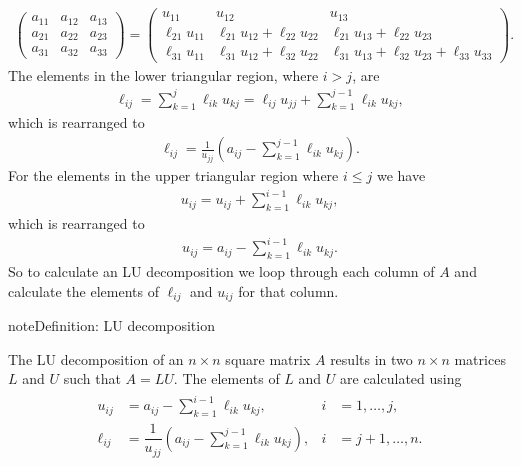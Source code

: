 \documentclass[letterpaper,10pt,english]{jupyterBook}
\begin{document}
\begin{align*}
    \begin{pmatrix}
        a_{11}  & a_{12}  & a_{13} \\
        a_{21}  & a_{22}  & a_{23} \\
        a_{31}  & a_{32}  & a_{33} 
    \end{pmatrix}=
    \begin{pmatrix}
        u_{11}  & u_{12}  & u_{13} \\
        \ell_{21} u_{11}  & \ell_{21} u_{12} + \ell_{22} u_{22}  & \ell_{21} u_{13} + \ell_{22} u_{23} \\
        \ell_{31} u_{11}  & \ell_{31} u_{12} + \ell_{32} u_{22}  & \ell_{31} u_{13} +\ell_{32} u_{23} +\ell_{33} u_{33} 
    \end{pmatrix}.
\end{align*}
\sphinxAtStartPar
The elements in the lower triangular region, where \(i>j\), are
\begin{align*}
    \ell_{ij} =\sum_{k=1}^j \ell_{ik} u_{kj} =\ell_{ij} u_{jj} +\sum_{k=1}^{j-1} \ell_{ik} u_{kj}, 
\end{align*}
\sphinxAtStartPar
which is rearranged to
\begin{align*}
    \ell_{ij} =\frac{1}{u_{jj} }\left(a_{ij} -\sum_{k=1}^{j-1} \ell_{ik} u_{kj} \right).
\end{align*}
\sphinxAtStartPar
For the elements in the upper triangular region where \(i\le j\) we have
\begin{align*}
    u_{ij} =u_{ij} +\sum_{k=1}^{i-1} \ell_{ik} u_{kj},
\end{align*}
\sphinxAtStartPar
which is rearranged to
\begin{align*}
    u_{ij} = a_{ij} -\sum_{k=1}^{i-1} \ell_{ik} u_{kj}.
\end{align*}
\sphinxAtStartPar
So to calculate an LU decomposition we loop through each column of \(A\) and calculate the elements of \(\ell_{ij}\) and \(u_{ij}\) for that column.

\begin{sphinxadmonition}{note}{Definition: LU decomposition}

\sphinxAtStartPar
The LU decomposition of an \(n \times n\) square matrix \(A\) results in two \(n \times n\) matrices \(L\) and \(U\) such that \(A = LU\). The elements of \(L\) and \(U\) are calculated using
\begin{equation}\label{equation:6_Direct_methods/6.1_LU_decomposition:lu-equation}
\begin{split}\begin{align}
u_{ij} &= a_{ij} - \sum_{k=1}^{i-1} \ell_{ik}u_{kj}, & i &= 1, \ldots, j, \\
\ell_{ij} &= \dfrac{1}{u_{jj}} \left(a_{ij} - \displaystyle \sum_{k=1}^{j-1} \ell_{ik}u_{kj}\right), & i &= j+1, \ldots, n.
\end{align}\end{split}
\end{equation}\end{sphinxadmonition}
\end{document}
